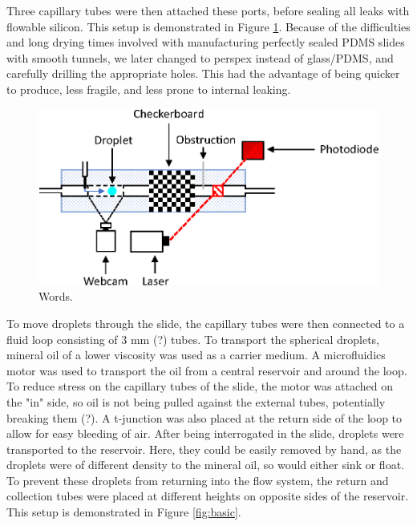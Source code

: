 \documentclass{physics_article_B}
\begin{document}
        Three capillary tubes were then attached these ports, before sealing all leaks with flowable silicon. This setup is demonstrated in Figure \ref{fig:control}. Because of the difficulties and long drying times involved with manufacturing perfectly sealed PDMS slides with smooth tunnels, we later changed to perspex instead of glass/PDMS, and carefully drilling the appropriate holes. This had the advantage of being quicker to produce, less fragile, and less prone to internal leaking. \\
        
            \begin{figure}[H]
            \centering
            \hspace*{2cm}\includegraphics[scale=0.9]{Figures/Control.eps}
            \captionsetup{justification=centering}
            \caption{Words.} 	
            \label{fig:control}
            \end{figure} 
    
        To move droplets through the slide, the capillary tubes were then connected to a fluid loop consisting of 3 mm (?) tubes. To transport the spherical droplets, mineral oil of a lower viscosity was used as a carrier medium. A microfluidics motor was used to transport the oil from a central reservoir and around the loop. To reduce stress on the capillary tubes of the slide, the motor was attached on the "in" side, so oil is not being pulled against the external tubes, potentially breaking them (?). A t-junction was also placed at the return side of the loop to allow for easy bleeding of air. After being interrogated in the slide, droplets were transported to the reservoir. Here, they could be easily removed by hand, as the droplets were of different density to the mineral oil, so would either sink or float. To prevent these droplets from returning into the flow system, the return and collection tubes were placed at different heights on opposite sides of the reservoir. This setup is demonstrated in Figure \ref{fig:basic}.
        
\end{document}

